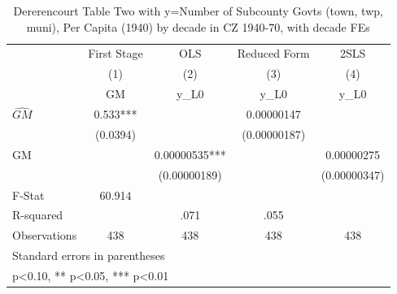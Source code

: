 \begin{table}[htbp]\centering
\def\sym#1{\ifmmode^{#1}\else\(^{#1}\)\fi}
\caption{Dererencourt Table Two with y=Number of Subcounty Govts (town, twp, muni), Per Capita (1940) by decade in CZ 1940-70, with decade FEs}
\begin{tabular}{l*{4}{c}}
\toprule
                    & First Stage   &         OLS   &Reduced Form   &        2SLS   \\
                    &\multicolumn{1}{c}{(1)}&\multicolumn{1}{c}{(2)}&\multicolumn{1}{c}{(3)}&\multicolumn{1}{c}{(4)}\\
                    &\multicolumn{1}{c}{GM}&\multicolumn{1}{c}{y\_L0}&\multicolumn{1}{c}{y\_L0}&\multicolumn{1}{c}{y\_L0}\\
\midrule
$\hat{GM}$          &       0.533***&               &  0.00000147   &               \\
                    &    (0.0394)   &               &(0.00000187)   &               \\
\addlinespace
GM                  &               &  0.00000535***&               &  0.00000275   \\
                    &               &(0.00000189)   &               &(0.00000347)   \\
\midrule
F-Stat              &      60.914   &               &               &               \\
R-squared           &               &        .071   &        .055   &               \\
Observations        &         438   &         438   &         438   &         438   \\
\bottomrule
\multicolumn{5}{l}{\footnotesize Standard errors in parentheses}\\
\multicolumn{5}{l}{\footnotesize * p<0.10, ** p<0.05, *** p<0.01}\\
\end{tabular}
\end{table}
